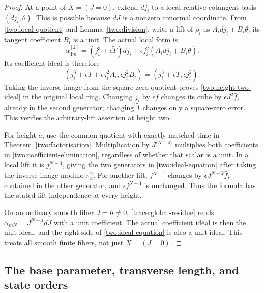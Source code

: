 \begin{proof}
At a point of $X=(J=0)$, extend $dj_i$ to a local relative
cotangent basis $(dj_i,\theta)$. This is possible because
$dJ$ is a nonzero conormal coordinate. From
\eqref{two:local-quotient} and Lemma~\ref{two:division},
write a lift of $\rho_i$ as $A_i dj_i+B_i\theta$; its
tangent coefficient $B_i$ is a unit. The actual local form is
\[
 \alpha_{4m}^{[2]}=(j_i^3+\epsilon\widetilde T)dj_i
             +\epsilon j_i^2(A_i dj_i+B_i\theta).
\]
Its coefficient ideal is therefore
\begin{equation}
 (j_i^3+\epsilon\widetilde T+\epsilon j_i^2A_i,
                                      \epsilon j_i^2B_i)
 =(j_i^3+\epsilon\widetilde T,\epsilon j_i^2).
 \label{two:coefficient-elimination}
\end{equation}
Taking the inverse image from the square-zero quotient proves
\eqref{two:height-two-ideal} in the original local ring.
Changing $j_i$ by $\epsilon f$ changes its cube by
$\epsilon J^2\bar f$, already in the second generator;
changing $\widetilde T$ changes only a square-zero error.
This verifies the arbitrary-lift assertion at height two.

For height $a$, use the common quotient with exactly matched
time in Theorem~\ref{two:factorisation}. Multiplication by
$J^{\langle N-4\rangle}$ multiplies both coefficients in
\eqref{two:coefficient-elimination}, regardless of whether
that scalar is a unit. In a local lift it is $j_i^{N-4}$,
giving the two generators in \eqref{two:ideal-equation}
after taking the inverse image modulo $\pi_a^2$.
For another lift, $j^{N-1}$ changes by
$\epsilon J^{N-2}\bar f$, contained in the other generator,
and $\epsilon j^{N-4}$ is unchanged. Thus the formula has
the stated lift independence at every height.

On an ordinary smooth fiber $J=h\ne0$,
\eqref{trace:global-residue} reads
$\bar\alpha_{mN}=J^{N-1}dJ$ with a unit coefficient.
The actual coefficient ideal is then the unit ideal, and the
right side of \eqref{two:ideal-equation} is also a unit ideal.
This treats all smooth finite fibers, not just $X=(J=0)$.
\end{proof}

\subsection{The base parameter, transverse length, and state orders}

